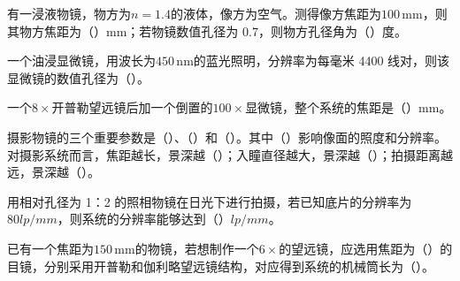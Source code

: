 \documentclass[padl, analysis, notocnum]{ExBook}
\newcommand{\answerarea}[1][3.5cm]{%
  \par\vspace{1mm}%
  \noindent{\color{themeColor!35}\rule{\linewidth}{0.4pt}}\par
  \noindent\begin{minipage}[t][#1][t]{\linewidth}\vspace{0pt}\end{minipage}\par
  \noindent{\color{themeColor!35}\rule{\linewidth}{0.4pt}}\par
}
\begin{document}
\begin{qitems}[startnum=8]
\qitem 有一浸液物镜，物方为$n=1.4$的液体，像方为空气。测得像方焦距为$100\,\mathrm{mm}$，则其物方焦距为（\hspace{1.6em}）mm；若物镜数值孔径为 0.7，则物方孔径角为（\hspace{1.6em}）度。
\label{q:154:start}
\answerarea[4.0cm]
\label{q:154:end}
\end{qitems}

\begin{qitems}[startnum=9]
\qitem 一个油浸显微镜，用波长为$450\,\mathrm{nm}$的蓝光照明，分辨率为每毫米 4400 线对，则该显微镜的数值孔径为（\hspace{1.6em}）。
\label{q:155:start}
\answerarea[4.0cm]
\label{q:155:end}
\end{qitems}

\begin{qitems}[startnum=10]
\qitem 一个$8\times$开普勒望远镜后加一个倒置的$100\times$显微镜，整个系统的焦距是（\hspace{1.6em}）mm。
\label{q:156:start}
\answerarea[4.0cm]
\label{q:156:end}
\end{qitems}

\begin{qitems}[startnum=11]
\qitem 摄影物镜的三个重要参数是（\hspace{1.6em}）、（\hspace{1.6em}）和（\hspace{1.6em}）。其中（\hspace{1.6em}）影响像面的照度和分辨率。对摄影系统而言，焦距越长，景深越（\hspace{1.6em}）；入瞳直径越大，景深越（\hspace{1.6em}）；拍摄距离越远，景深越（\hspace{1.6em}）。
\label{q:157:start}
\answerarea[4.0cm]
\label{q:157:end}
\end{qitems}

\begin{qitems}[startnum=12]
\qitem 用相对孔径为 1：2 的照相物镜在日光下进行拍摄，若已知底片的分辨率为$80lp/mm$，则系统的分辨率能够达到（\hspace{1.6em}）$lp/mm$。
\label{q:158:start}
\answerarea[4.0cm]
\label{q:158:end}
\end{qitems}

\begin{qitems}[startnum=13]
\qitem 已有一个焦距为$150\,\mathrm{mm}$的物镜，若想制作一个$6\times$的望远镜，应选用焦距为（\hspace{1.6em}）的目镜，分别采用开普勒和伽利略望远镜结构，对应得到系统的机械筒长为（\hspace{1.6em}）。
\label{q:159:start}
\answerarea[4.0cm]
\label{q:159:end}
\end{qitems}
\end{document}
